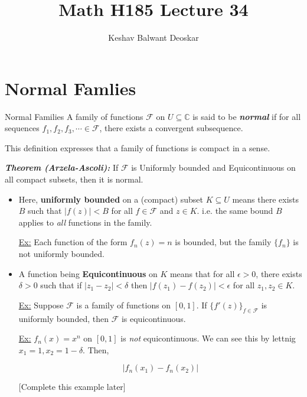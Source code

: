 \documentclass{article}
\title{Math H185 Lecture 34}
\author{Keshav Balwant Deoskar}
\newcommand{\C}{\mathbb{C}}
\begin{document}
\maketitle

\tableofcontents
\pagebreak

\section{Normal Famlies}

\vskip 0.5cm
\begin{mathdefinitionbox}{Normal Families}
\vskip 0.25cm
  A family of functions $\mathcal{F}$ on $U \subseteq \C$ is said to be \emph{\textbf{normal}} if for all sequences $f_1, f_2, f_3, \cdots \in \mathcal{F}$, there exists a convergent subsequence.
\end{mathdefinitionbox}

\vskip 0.5cm
This definition expresses that a family of functions is compact in a sense.

\vskip 0.5cm

\begin{dottedbox}
  \emph{\textbf{Theorem (Arzela-Ascoli):}} If $\mathcal{F}$ is Uniformly bounded and Equicontinuous on all compact subsets, then it is normal.
\end{dottedbox}

\vskip 0.5cm
\begin{itemize}
  \item Here, \textbf{uniformly bounded} on a (compact) subset $K \subseteq U$ means there exists $B$ such that $|f(z)| < B$ for all $f \in \mathcal{F}$ and $z \in K$. i.e. the same bound $B$ applies to \emph{all} functions in the family.

  \vskip 0.5cm
  \underline{Ex:} Each function of the form $f_n(z) = n$ is bounded, but the family $\{f_n\}$ is not uniformly bounded.
  
  \vskip 0.5cm
  \item A function being \textbf{Equicontinuous} on $K$ means that for all $\epsilon > 0$, there exists $\delta > 0$ such that if $|z_1  -z_2| < \delta$ then $|f(z_1) - f(z_2)| < \epsilon$ for all $z_1, z_2 \in K$.
  
  \vskip 0.5cm
  \underline{Ex:} Suppose $\mathcal{F}$ is a family of functions on $[0, 1]$. If $\{f'(z)\}_{f \in \mathcal{F}}$ is uniformly bounded, then $\mathcal{F}$ is equicontinuous.
  
  \vskip 0.5cm
  \underline{Ex:} $f_n(x) = x^n$ on $[0, 1]$ is \emph{not} equicontinuous. We can see this by lettnig $x_1 = 1, x_2 = 1-\delta$. Then, 
  
  \[ |f_n(x_1) - f_n(x_2)|  \]
  
  [Complete this example later]
\end{itemize}
\end{document}
